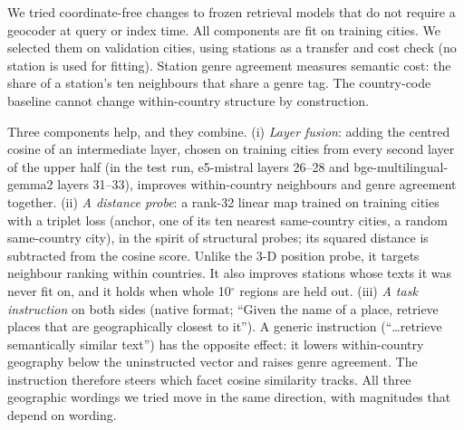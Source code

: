 We tried coordinate-free changes to frozen retrieval models that do not require a geocoder at query or index time. All components are fit on training cities. We selected them on validation cities, using stations as a transfer and cost check (no station is used for fitting). Station genre agreement measures semantic cost: the share of a station's ten neighbours that share a genre tag. The country-code baseline cannot change within-country structure by construction.

Three components help, and they combine.
(i) \emph{Layer fusion}: adding the centred cosine of an intermediate layer, chosen on training cities from every second layer of the upper half (in the test run, e5-mistral layers 26--28 and bge-multilingual-gemma2 layers 31--33), improves within-country neighbours and genre agreement together.
(ii) \emph{A distance probe}: a rank-32 linear map trained on training cities with a triplet loss (anchor, one of its ten nearest same-country cities, a random same-country city), in the spirit of structural probes; its squared distance is subtracted from the cosine score. Unlike the 3-D position probe, it targets neighbour ranking within countries. It also improves stations whose texts it was never fit on, and it holds when whole 10$^\circ$ regions are held out.
(iii) \emph{A task instruction} on both sides (native format; ``Given the name of a place, retrieve places that are geographically closest to it''). A generic instruction (``\ldots retrieve semantically similar text'') has the opposite effect: it lowers within-country geography below the uninstructed vector and raises genre agreement. The instruction therefore steers which facet cosine similarity tracks. All three geographic wordings we tried move in the same direction, with magnitudes that depend on wording.

